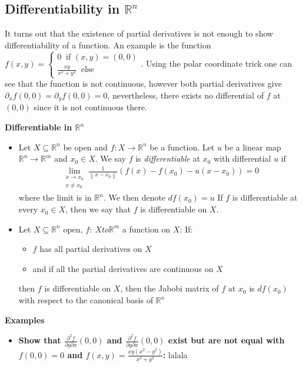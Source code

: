\documentclass[25pt]{sciposter}
\newcommand{\R}{\mathbb{R}}
\newcommand{\norm}[1]{\left\lVert#1\right\rVert}
\newenvironment{method}[1]{\begin{mdframed}[backgroundcolor=blue!10,innertopmargin=15pt, innerbottommargin=15pt, nobreak=true]
		\textbf{#1 }
	}
	{ 
	\end{mdframed}
}
\begin{document}
\begin{multicols}{3}
\section*{Differentiability in $\R^n$}
It turns out that the existence of partial derivatives is not enough to show differentiability of a function. An example is the function $f(x,y) = \begin{cases} 
0 \ \text{ if } (x,y) = (0,0)\\
\frac{xy}{x^2+y^2} \ \text{ else}
\end{cases}$. Using the polar coordinate trick one can see that the function is not continuous, however both partial derivatives give $\partial_{x} f(0,0) = \partial_{y}f(0,0) = 0$, nevertheless, there exists no differential of $f$ at $(0,0)$ since it is not continuous there.
\begin{method}{Differentiable in $\R^n$}
	\begin{itemize}
		\item 	Let $X\subseteq \R^n$ be open and $f: X \to \R^n$ be a function. Let $u$ be a linear map $\R^n \to \R^m$ and $x_0 \in X$. We say $f$ is \textit{differentiable} at $x_0$ with differential $u$ if
		\begin{align*}
		\lim\limits_{\substack{x\to x_0 \\x \not = x_0}} \frac{1}{\norm{x-x_0}} (f(x) -f(x_0) - u(x-x_0) ) = 0
		\end{align*}
		where the limit is in $\R^n$. We then denote $df(x_0) = u$
		If $f$ is differentiable at every $x_0 \in X$, then we say that $f$ is differentiable on $X$.
		\item Let $X \subseteq \R^n$ open, $f:\ X to \R^m$ a function on $X$: If:
		\begin{itemize}
			\item $f$ has all partial derivatives on $X$
			\item and if all the partial derivatives are continuous on $X$
		\end{itemize}
	then $f$ is differentiable on $X$, then the Jabobi matrix of $f$ at $x_0$ is $df(x_0)$ with respect to the canonical basis of $\R^n$
	\end{itemize}
\end{method}

\textbf{Examples}

\begin{itemize}
	\item \textbf{Show that $\frac{\partial^2 f}{\partial y \partial x}(0,0)$ and $\frac{\partial^2 f}{\partial y \partial x}(0,0)$ exist but are not equal with $f(0,0) = 0$ and $f(x,y) = \frac{xy(x^2-y^2)}{x^2 + y^2}$:}
	lalala
	

\end{itemize}
\end{multicols}
\end{document}
